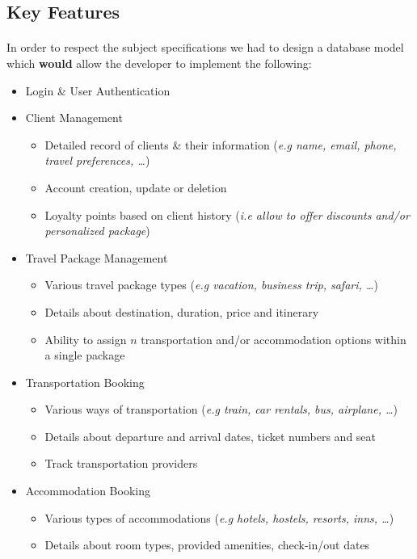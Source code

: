 \documentclass[11pt,a4paper,titlepage]{article}
\begin{document}
\subsection{Key Features}
\paragraph{}
In order to respect the subject specifications we had to design a database model which \textbf{would} allow the developer to implement the following:
\begin{itemize}
	\item Login \& User Authentication
	\item Client Management
	\begin{itemize}
		\item Detailed record of clients \& their information (\textit{e.g name, email, phone, travel preferences, \ldots})
		\item Account creation, update or deletion
		\item Loyalty points based on client history (\textit{i.e allow to offer discounts and/or personalized package})
	\end{itemize}
	\item Travel Package Management
	\begin{itemize}
		\item Various travel package types (\textit{e.g vacation, business trip, safari, \ldots})
		\item Details about destination, duration, price and itinerary
		\item Ability to assign $n$ transportation and/or accommodation options within a single package
	\end{itemize}
	\item Transportation Booking
	\begin{itemize}
		\item Various ways of transportation (\textit{e.g train, car rentals, bus, airplane, \ldots})
		\item Details about departure and arrival dates, ticket numbers and seat
		\item Track transportation providers
	\end{itemize}
	\item Accommodation Booking
	\begin{itemize}
		\item Various types of accommodations (\textit{e.g hotels, hostels, resorts, inns, \ldots})
		\item Details about room types, provided amenities, check-in/out dates

\end{itemize}
\end{itemize}
\end{document}
